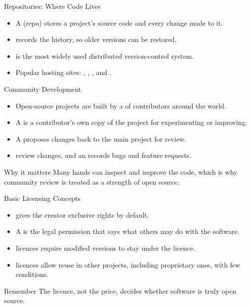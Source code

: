 \documentclass[aspectratio=169]{beamer}
\begin{document}
\begin{frame}{Repositories: Where Code Lives}
  \begin{itemize}
    \item A  (repo) stores a project's source code and every
      change made to it.
    \item {} records the history, so older versions can be
      restored.
    \item {} is the most widely used distributed version-control system.
    \item Popular hosting sites: , , ,
      and .
  \end{itemize}
\end{frame}

\begin{frame}{Community Development}
  \begin{itemize}
    \item Open-source projects are built by a  of contributors
      around the world.
    \item A  is a contributor's own copy of the project for
      experimenting or improving.
    \item A  proposes changes back to the main project for
      review.
    \item {} review changes, and an  records
      bugs and feature requests.
  \end{itemize}
  \begin{block}{Why it matters}
    Many hands can inspect and improve the code, which is why community review
    is treated as a strength of open source.
  \end{block}
\end{frame}

\begin{frame}{Basic Licensing Concepts}
  \begin{itemize}
    \item {} gives the creator exclusive rights by default.
    \item A  is the legal permission that says what others may do
      with the software.
    \item {} licences require modified versions to stay under the
       licence.
    \item {} licences allow reuse in other projects, including
      proprietary ones, with few conditions.
  \end{itemize}
  \begin{alertblock}{Remember}
    The licence, not the price, decides whether software is truly open source.
  \end{alertblock}
\end{frame}
\end{document}
